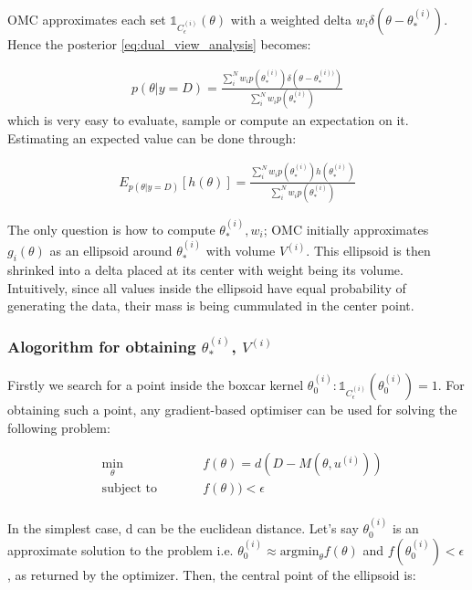 \documentclass{article}
\begin{document}
OMC approximates each set $\mathbb{1}_{C_\epsilon^{(i)}}(\theta)$ with a weighted delta $w_i\delta(\theta - \theta_*^{(i)})$. Hence the posterior \ref{eq:dual_view_analysis} becomes:

\begin{gather} \label{eq:OMC_posterior}
  p(\theta|y=D) = \frac{\sum_i^N w_i p(\theta_*^{(i)})\delta(\theta - \theta_*^{(i))})}{\sum_i^N w_i p(\theta_*^{(i)})}
\end{gather}
%
which is very easy to evaluate, sample or compute an expectation on it.
Estimating an expected value can be done through:

\begin{gather} \label{eq:OMC_expectation}
  E_{p(\theta|y=D)}[h(\theta)] = \frac{\sum_i^N w_i p(\theta_*^{(i)})h(\theta_*^{(i)})}{\sum_i^N w_i p(\theta_*^{(i)})}
\end{gather}


The only question is how to compute $\theta_*^{(i)}, w_i$; OMC initially approximates $g_i(\theta)$ as an ellipsoid around $\theta_*^{(i)}$ with volume $V^{(i)}$. This ellipsoid is then shrinked into a delta placed at its center with weight being its volume. Intuitively, since all values inside the ellipsoid have equal probability of generating the data, their mass is being cummulated in the center point.

\subsubsection*{Alogorithm for obtaining $\theta_*^{(i)}$, $V^{(i)}$}

Firstly we search for a point inside the boxcar kernel $\theta_0^{(i)}: \mathbb{1}_{C_\epsilon^{(i)}}(\theta_0^{(i)}) = 1$. 
%
For obtaining such a point, any gradient-based optimiser can be used for solving the following problem:
 
\begin{subequations}
\begin{alignat}{2}
&\!\min_{\theta}        &\qquad& f(\theta) = d(D - M(\theta, u^{(i)}))\label{eq:optProb}\\
&\text{subject to} &      & f(\theta)) < \epsilon \\
\end{alignat}
\end{subequations}

In the simplest case, d can be the euclidean distance. Let's say $\theta_0^{(i)}$ is an approximate solution to the problem i.e. $\theta_0^{(i)} \approx \text{argmin}_\theta f(\theta)$ and $f(\theta_0^{(i)}) < \epsilon$, as returned by the optimizer. Then, the central point of the ellipsoid is:
\end{document}
